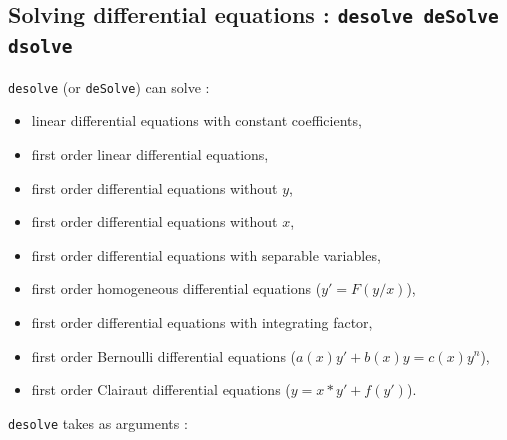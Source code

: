 \documentclass[a4paper,11pt]{book}
\begin{document}
\subsection{Solving differential equations : {\tt desolve deSolve 
dsolve}}
{\tt desolve} (or {\tt deSolve}) can solve :
\begin{itemize}
\item linear differential equations with constant coefficients,
\item first order linear differential equations,
\item first order differential equations without $y$,
\item first order differential equations without $x$,
\item first order differential equations with separable variables,
\item first order homogeneous differential equations ($y'=F(y/x)$),
\item first order differential equations with integrating factor,
\item first order Bernoulli differential equations ($a(x)y'+b(x)y=c(x)y^n$),
\item first order Clairaut differential equations ($y=x*y'+f(y')$).
\end{itemize}
{\tt desolve} takes as arguments : 
\end{document}
